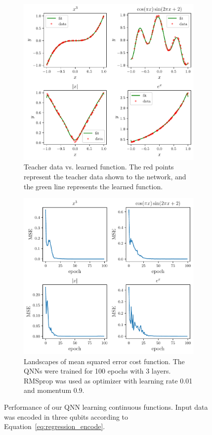 \documentclass[a4paper,10pt]{article}
\begin{document}
\begin{figure}[ht]
	\centering
	\begin{subfigure}{.4875\textwidth}
		\centering
		\includegraphics[width=1\linewidth]{figures/qnn_regression.pdf}
		\caption{Teacher data vs. learned function. The red points represent the teacher data shown to the network, and the green line represents the learned function.}
	\end{subfigure}
	\hfill
	\begin{subfigure}{.4875\textwidth}
		\centering
		\includegraphics[width=1\linewidth]{figures/qnn_regression_mse.pdf}
		\caption{Landscapes of mean squared error cost function. The QNNs were trained for 100 epochs with 3 layers. RMSprop was used as optimizer with learning rate 0.01 and momentum 0.9.}
	\end{subfigure}
	\caption{Performance of our QNN learning continuous functions. Input data was encoded in three qubits according to Equation~\ref{eq:regression_encode}.}
	\label{fig:qnn_regression_results}
\end{figure}
\end{document}
